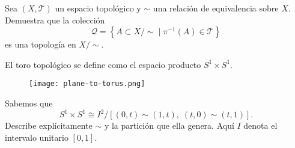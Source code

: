 \documentclass[b5paper,10pt,twoside]{book}
\begin{document}
\begin{problem}
Sea \((X,\mathcal{T})\) 
un espacio topológico
y \(\sim\) una relación 
de equivalencia sobre
\(X\).
Demuestra 
que la colección
\[
\mathcal{Q} = \left\{ 
    A\subset X/\!\!\sim \;\bigg|\; \pi^{-1}(A)\in  \mathcal{T}
 \right\}
\]
es una topología
en \(X/\!\!\sim\).
\end{problem}

\pagebreak

\begin{problem}
El toro topológico se define como el espacio  producto   \(S^1\times S^1\).

\begin{figure}[!htb]
    \centering
    \texttt{[image: plane-to-torus.png]}
\end{figure}

Sabemos que 
\[
S^1\times S^1 \cong I^2 / [(0,t)\sim(1,t),\; (t,0)\sim (t,1)].
\]
Describe explícitamente \(\sim\) y la partición que ella genera.
Aquí \(I\) denota el 
intervalo unitario \([0,1]\).
\end{problem}
\end{document}
